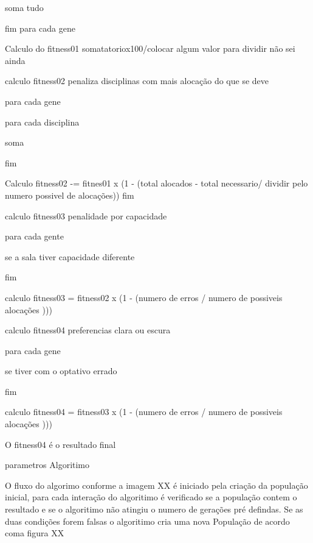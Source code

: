 \documentclass{abntpuc}
\begin{document}
soma tudo

fim para cada gene

Calculo do fitness01 somatatoriox100/colocar algum valor  para dividir não sei ainda

calculo fitness02 penaliza disciplinas com mais alocação do que se deve

para cada gene 

para cada disciplina 

soma

fim

Calculo fitness02 -= fitnes01 x (1 - (total alocados - total necessario/ dividir pelo numero possivel de alocações))
fim

calculo fitness03 penalidade por capacidade

para cada gente

se a sala tiver capacidade diferente

fim

calculo fitness03 = fitness02 x (1 - (numero de erros /  numero de possiveis alocações )))


calculo fitness04 preferencias clara ou escura

para cada gene 

se tiver com o optativo errado 

fim	

calculo fitness04 = fitness03 x (1 - (numero de erros /  numero de possiveis alocações )))


O fitness04 é o resultado final


parametros Algoritimo

O fluxo do algorimo conforme a imagem XX é iniciado pela criação da população inicial, para cada interação do algoritimo é verificado se a população contem o resultado e se o algoritimo não atingiu o numero de gerações pré defindas. Se as duas condições forem falsas o algoritimo cria uma nova População de acordo coma figura XX
\end{document}
